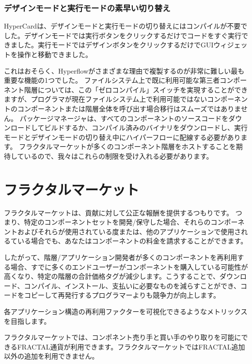\documentclass[%
 aip,
 jmp,
 amsmath,amssymb,
 preprint,
 reprint,
 author-year,
 author-numerical,
]{revtex4-1}
\begin{document}
\begin{CJK}{UTF8}{ipxm}
\subsubsection{\label{sec:Fast switching between run mode and design mode}デザインモードと実行モードの素早い切り替え}

HyperCardは、デザインモードと実行モードの切り替えにはコンパイルが不要でした。デザインモードでは実行ボタンをクリックするだけでコードをすぐ実行できました。実行モードではデザインボタンをクリックするだけでGUIウィジェットを操作と移動できました。

これはおそらく、Hyperflowがさまざまな理由で複製するのが非常に難しい最も重要な機能の1つでした。
ファイルシステム上で既に利用可能な第三者コンポーネント階層については、この「ゼロコンパイル」スイッチを実現することができますが、プログラマが現在ファイルシステム上で利用可能ではないコンポーネントのコンポーネントまたは階層全体を呼び出す場合移行はスムーズではありません。
パッケージマネージャは、すべてのコンポーネントのソースコードをダウンロードしてビルドするか、コンパイル済みのバイナリをダウンロードし、実行モードとデザインモードの切り替え中にハイパーフローに配線する必要があります。
フラクタルマーケットが多くのコンポーネント階層をホストすることを期待しているので、我々はこれらの制限を受け入れる必要があります。


\section{\label{sec:Fractalmarket}フラクタルマーケット}

フラクタルマーケットは、貢献に対して公正な報酬を提供するつもりです。 つまり、特定のコンポーネントセットを開発/保守した場合、それらのコンポーネントおよびそれらが使用されている度または、他のアプリケーションで使用されるている場合でも、あなたはコンポーネントの料金を請求することができます。

したがって、階層/アプリケーション開発者が多くのコンポーネントを再利用する場合、すでに多くのエンドユーザーがコンポーネントを購入している可能性が高くなり、特定の階層の合計価格タグが減少します。こうすることで、ダウンロード、コンパイル、インストール、支払いに必要なものを減らすことができ、コードをコピーして再発行するプログラマーよりも競争力が向上します。

各アプリケーション構造の再利用ファクターを可視化できるようなメトリックスを目指します。

フラクタルマーケットでは、コンポネント売り手と買い手のやり取りを可能にできるFRACTAL通貨が利用できます。フラクタルマーケットではFRACTAL追加以外の追加を利用できません。


\end{CJK}
\end{document}
